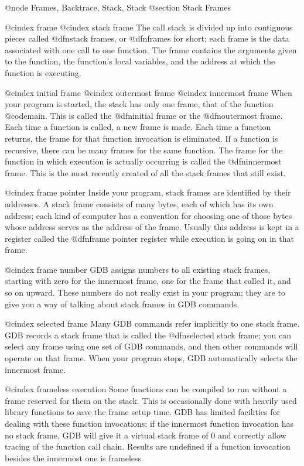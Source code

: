 @node Frames, Backtrace, Stack, Stack
@section Stack Frames

@cindex frame
@cindex stack frame
The call stack is divided up into contiguous pieces called @dfn{stack
frames}, or @dfn{frames} for short; each frame is the data associated
with one call to one function.  The frame contains the arguments given
to the function, the function's local variables, and the address at
which the function is executing.

@cindex initial frame
@cindex outermost frame
@cindex innermost frame
When your program is started, the stack has only one frame, that of the
function @code{main}.  This is called the @dfn{initial} frame or the
@dfn{outermost} frame.  Each time a function is called, a new frame is
made.  Each time a function returns, the frame for that function invocation
is eliminated.  If a function is recursive, there can be many frames for
the same function.  The frame for the function in which execution is
actually occurring is called the @dfn{innermost} frame.  This is the most
recently created of all the stack frames that still exist.

@cindex frame pointer
Inside your program, stack frames are identified by their addresses.  A
stack frame consists of many bytes, each of which has its own address; each
kind of computer has a convention for choosing one of those bytes whose
address serves as the address of the frame.  Usually this address is kept
in a register called the @dfn{frame pointer register} while execution is
going on in that frame.

@cindex frame number
GDB assigns numbers to all existing stack frames, starting with zero for
the innermost frame, one for the frame that called it, and so on upward.
These numbers do not really exist in your program; they are to give you a
way of talking about stack frames in GDB commands.

@cindex selected frame
Many GDB commands refer implicitly to one stack frame.  GDB records a stack
frame that is called the @dfn{selected} stack frame; you can select any
frame using one set of GDB commands, and then other commands will operate
on that frame.  When your program stops, GDB automatically selects the
innermost frame.

@cindex frameless execution
Some functions can be compiled to run without a frame reserved for them
on the stack.  This is occasionally done with heavily used library
functions to save the frame setup time.  GDB has limited facilities for
dealing with these function invocations; if the innermost function
invocation has no stack frame, GDB will give it a virtual stack frame of
0 and correctly allow tracing of the function call chain.  Results are
undefined if a function invocation besides the innermost one is
frameless. 

